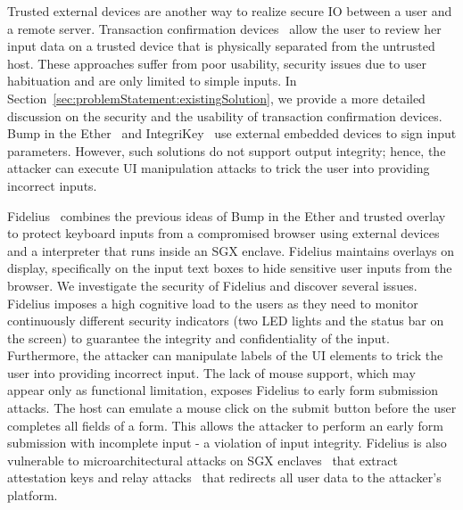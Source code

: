 Trusted external devices are another way to realize secure IO between a user and a remote server. Transaction confirmation devices~\cite{filyanov2011uni,weigold2011secure} allow the user to review her input data on a trusted device that is physically separated from the untrusted host. These approaches suffer from poor usability, security issues due to user habituation and are only limited to simple inputs. In Section~\ref{sec:problemStatement:existingSolution}, we provide a more detailed discussion on the security and the usability of transaction confirmation devices. Bump in the Ether~\cite{McCPerRei2006} and IntegriKey~\cite{IntegriKey} use external embedded devices to sign input parameters. However, such solutions do not support output integrity; hence, the attacker can execute UI manipulation attacks to trick the user into providing incorrect inputs. %


Fidelius~\cite{Fidelius} combines the previous ideas of Bump in the Ether and trusted overlay to protect keyboard inputs from a compromised browser using external devices and a \js interpreter that runs inside an SGX enclave. Fidelius maintains overlays on display, specifically on the input text boxes to hide sensitive user inputs from the browser. We investigate the security of Fidelius and discover several issues. Fidelius imposes a high cognitive load to the users as they need to monitor continuously different security indicators (two LED lights and the status bar on the screen) to guarantee the integrity and confidentiality of the input. Furthermore, the attacker can manipulate labels of the UI elements to trick the user into providing incorrect input. 
The lack of mouse support, which may appear only as functional limitation, exposes Fidelius to early form submission attacks. The host can emulate a mouse click on the submit button before the user completes all fields of a form.
This allows the attacker to perform an early form submission with incomplete input - a violation of input integrity. Fidelius is also vulnerable to microarchitectural attacks on SGX enclaves~\cite{van2018foreshadow} that extract attestation keys and relay attacks~\cite{dhar2018proximitee} that redirects all user data to the attacker's platform.


